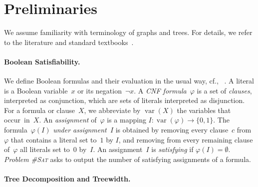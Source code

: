 \documentclass{llncs}
\newcommand{\longversion}[1]{#1}
\newcommand{\cSAT}{\textsc{\#Sat}\xspace}%
\DeclareMathOperator{\var}{var}
\begin{document}
\section{Preliminaries}

We assume familiarity with terminology of graphs and trees.
For details, we refer to the literature and standard textbooks~\cite{BondyMurty08,Diestel12}.

\label{fig:prim1}%
\paragraph*{Boolean Satisfiability.}
  We define Boolean formulas and their evaluation in the usual
  way, cf., ~\cite{GomesKautzSabharwalSelman08a,KleineBuningLettman99}.
  A literal is a Boolean variable~$x$ or its negation~$\neg
  x$.
  A \emph{CNF formula}~$\varphi$ is a set of \emph{clauses}, interpreted as conjunction, which are sets of literals
  interpreted as disjunction. For a formula or clause~$X$, we
  abbreviate by $\var(X)$ the variables that occur~in~$X$.
%
%
%
%
%
%
%
%
%
An \emph{assignment} of~$\varphi$ is a mapping
$I: \var(\varphi) \rightarrow \{0,1\}$.
%
%
%
%
%
%
%
The formula~$\varphi(I)$ \emph{under assignment~$I$} is obtained
by removing every clause~$c$ from $\varphi$ that contains a literal set to~$1$
by $I$, and removing from every remaining clause of~$\varphi$ all literals set
to~$0$ by~$I$. An assignment~$I$ is \emph{satisfying} if
$\varphi(I)=\emptyset$.
%
\emph{Problem \cSAT} asks to output the number of satisfying assignments
of a formula.
%
%
%
%
%
%
%
%
%
%
%
%
%
%
%
%
%
%
%
%
%
%



%

%
\paragraph*{Tree Decomposition and Treewidth.} %
%
\end{document}

